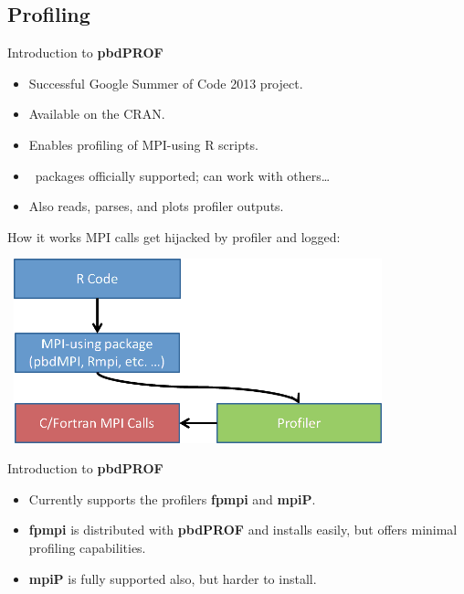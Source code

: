 \subsection{Profiling}
\makesubcontentsslidessec


\begin{frame}
  \begin{block}{Introduction to \textbf{pbdPROF}}
    \begin{itemize}
      \item Successful Google Summer of Code 2013 project.
      \item Available on the CRAN.
      \item Enables profiling of MPI-using R scripts.
      \item \pbdR\ packages officially supported; can work with others\dots
      \item Also reads, parses, and plots profiler outputs.
    \end{itemize}
  \end{block}
\end{frame}


\begin{frame}
  \begin{block}{How it works}
  MPI calls get hijacked by profiler and logged:
	\begin{center}
	  \ \hspace{2cm}\includegraphics[width=0.8\textwidth]{../common/pics/prof/mpi_profiler}
	\end{center}
  \end{block}
\end{frame}


\begin{frame}
  \begin{block}{Introduction to \textbf{pbdPROF}}
    \begin{itemize}
      \item Currently supports the profilers \textbf{fpmpi} and \textbf{mpiP}.
      \item \textbf{fpmpi} is distributed with \textbf{pbdPROF} and installs easily, but offers 
minimal profiling capabilities.
      \item \textbf{mpiP} is fully supported also, but harder to install.
    \end{itemize}
  \end{block}
\end{frame}



